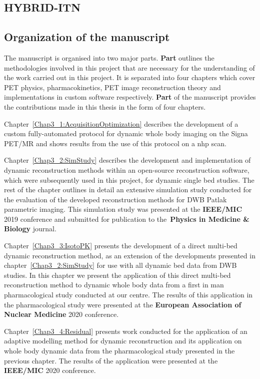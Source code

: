 \subsection*{HYBRID-ITN}


\subsection*{Organization of the manuscript}
The manuscript is organised into two major parts. \textbf{Part } outlines the methodologies involved in this project that are necessary for the understanding of the work carried out in this project. It is separated into four chapters which cover PET physics, pharmacokinetics, PET image reconstruction theory and implementations in custom software respectively. \textbf{Part } of the manuscript provides the contributions made in this thesis in the form of four chapters.

Chapter~\ref{Chap3_1:AcquisitionOptimization} describes the development of a custom fully-automated protocol for dynamic whole body imaging on the Signa PET/MR and shows results from the use of this protocol on a \gls{nhp} scan.

Chapter~\ref{Chap3_2:SimStudy} describes the development and implementation of dynamic reconstruction methods within an open-source reconstruction software, which were subsequently used in this project, for dynamic single bed studies. The rest of the chapter outlines in detail an extensive simulation study conducted for the evaluation of the developed reconstruction methods for DWB Patlak parametric imaging. This simulation study was presented at the \textbf{IEEE/MIC} 2019 conference and submitted for publication to the~\textbf{Physics in Medicine \& Biology} journal. 

Chapter~\ref{Chap3_3:IsotoPK} presents the development of a direct multi-bed dynamic reconstruction method, as an extension of the developments presented in chapter~\ref{Chap3_2:SimStudy} for use with all dynamic bed data from DWB studies. In this chapter we present the application of this direct multi-bed reconstruction method to dynamic whole body data from a first in man pharmacological study conducted at our centre. The results of this application in the pharmacological study were presented at the \textbf{European Association of Nuclear Medicine} 2020 conference.

Chapter~\ref{Chap3_4:Residual} presents work conducted for the application of an adaptive modelling method for dynamic reconstruction and its application on whole body dynamic data from the pharmacological study presented in the previous chapter. The results of the application were presented at the \textbf{IEEE/MIC} 2020 conference.

